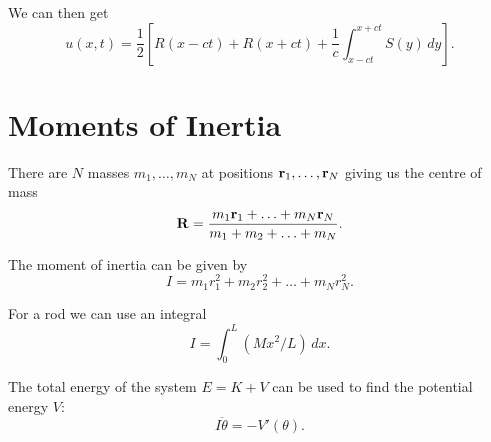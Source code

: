 \documentclass[10pt, a4paper]{article}
\begin{document}
We can then get
\[
u(x, t) = \frac{1}{2}\left[R(x - ct) + R(x + ct) + \frac{1}{c}\int_{x - ct}^{x + ct}S(y)\,dy\right].
\]

\newpage

\section{Moments of Inertia}

There are $N$ masses $m_1, \dotsc, m_N$ at positions $\mathbf{r}_1, \dotsc, \mathbf{r}_N$ giving us the centre of mass
\[
\mathbf{R} = \frac{m_1\mathbf{r}_1 + \dotsc + m_N\mathbf{r}_N}{m_1 + m_2 + \dotsc + m_N}.
\]

The moment of inertia can be given by
\[
I = m_1r_1 ^ 2 + m_2r_2 ^ 2 + \dotsc + m_Nr_N ^ 2.
\]

For a rod we can use an integral
\[
I = \int_{0}^{L}(Mx ^ 2 / L)\,dx.
\]

The total energy of the system $E = K + V$ can be used to find the potential energy $V$:
\[
I\ddot{\theta} = -V'(\theta).
\]
\end{document}
